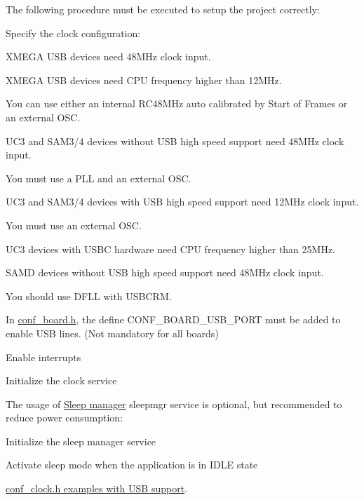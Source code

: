 The following procedure must be executed to setup the project correctly\-:
\begin{DoxyItemize}
\item Specify the clock configuration\-:
\begin{DoxyItemize}
\item X\-M\-E\-G\-A U\-S\-B devices need 48\-M\-Hz clock input.\par
 X\-M\-E\-G\-A U\-S\-B devices need C\-P\-U frequency higher than 12\-M\-Hz.\par
 You can use either an internal R\-C48\-M\-Hz auto calibrated by Start of Frames or an external O\-S\-C.
\item U\-C3 and S\-A\-M3/4 devices without U\-S\-B high speed support need 48\-M\-Hz clock input.\par
 You must use a P\-L\-L and an external O\-S\-C.
\item U\-C3 and S\-A\-M3/4 devices with U\-S\-B high speed support need 12\-M\-Hz clock input.\par
 You must use an external O\-S\-C.
\item U\-C3 devices with U\-S\-B\-C hardware need C\-P\-U frequency higher than 25\-M\-Hz.
\item S\-A\-M\-D devices without U\-S\-B high speed support need 48\-M\-Hz clock input.\par
 You should use D\-F\-L\-L with U\-S\-B\-C\-R\-M.
\end{DoxyItemize}
\item In \hyperlink{conf__board_8h}{conf\-\_\-board.\-h}, the define C\-O\-N\-F\-\_\-\-B\-O\-A\-R\-D\-\_\-\-U\-S\-B\-\_\-\-P\-O\-R\-T must be added to enable U\-S\-B lines. (Not mandatory for all boards)
\item Enable interrupts
\item Initialize the clock service
\end{DoxyItemize}

The usage of \hyperlink{group__sleepmgr__group}{Sleep manager} sleepmgr service is optional, but recommended to reduce power consumption\-:
\begin{DoxyItemize}
\item Initialize the sleep manager service
\item Activate sleep mode when the application is in I\-D\-L\-E state
\end{DoxyItemize}

\hyperlink{udc_conf_clock}{conf\-\_\-clock.\-h examples with U\-S\-B support}.

